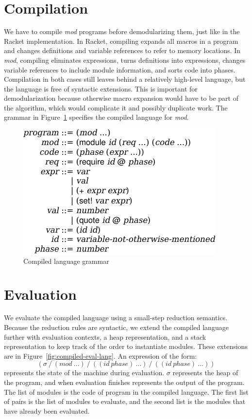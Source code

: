 \section{Compilation}

We have to compile \emph{mod} programs before demodularizing them, just like in the Racket implementation.
In Racket, compiling expands all macros in a program and changes definitions and variable references to refer to memory locations.
In \emph{mod}, compiling eliminates  expressions, turns definitions into  expressions, changes variable references to include module information, and sorts code into phases.
Compilation in both cases still leaves behind a relatively high-level language, but the language is free of syntactic extensions.
This is important for demodularization because otherwise macro expansion would have to be part of the algorithm, which would complicate it and possibly duplicate work.
The grammar in Figure~\ref{fig:compiled-lang} specifies the compiled language for \emph{mod}.

\begin{figure}[h]
\includegraphics{figures/compiled-lang}
\caption{Compiled language grammar}
\label{fig:compiled-lang}
\end{figure}

\section{Evaluation}

We evaluate the compiled language using a small-step reduction semantics. 
Because the reduction rules are syntactic, we extend the compiled language further with evaluation contexts, a heap representation, and a stack representation to keep track of the order to instantiate modules.
These extensions are in Figure~\ref{fig:compiled-eval-lang}.
An expression of the form:
\[
  (\sigma\ /\ (mod\ \ldots)\ /\ ((id\ phase)\ \ldots)\ /\ ((id\ phase)\ \ldots))
\]
represents the state of the machine during evaluation.
$\sigma$ represents the heap of the program, and when evaluation finishes represents the output of the program.
The list of modules is the code of program in the compiled language.
The first list of  pairs is the list of modules to evaluate, and the second list is the modules that have already been evaluated.

